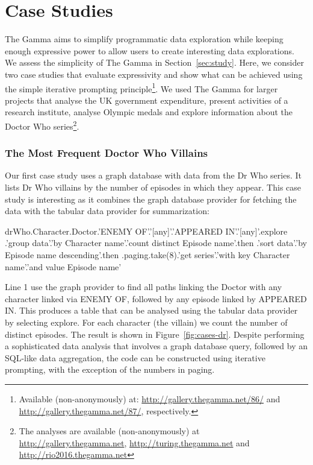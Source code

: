 \documentclass[manuscript,review,anonymous]{acmart}
\newcommand{\ikvd}[1]{{\fontfamily{zi4}\selectfont\small #1}}
\begin{document}

\section{Case Studies}
\label{sec:cases}

The Gamma aims to simplify programmatic data exploration while keeping enough expressive power
to allow users to create interesting data explorations. We assess the simplicity of The Gamma
in Section~\ref{sec:study}. Here, we consider two case studies that evaluate expressivity and show what
can be achieved using the simple iterative prompting principle\footnote{Available (non-anonymously) at:
\url{http://gallery.thegamma.net/86/} and  \url{http://gallery.thegamma.net/87/}, respectively.}.
We used The Gamma for larger projects that analyse the UK government expenditure, present
activities of a research institute, analyse Olympic medals and explore information about the Doctor
Who series\footnote{The analyses are available (non-anonymously)
at \url{http://gallery.thegamma.net}, \url{http://turing.thegamma.net} and \url{http://rio2016.thegamma.net}}.

\subsubsection*{The Most Frequent Doctor Who Villains}
Our first case study uses a graph database with data from the Dr Who series. It lists Dr Who villains
by the number of episodes in which they appear. This case study is interesting as it
combines the graph database provider for fetching the data with the tabular data provider for
summarization:

\begin{thegamma}
drWho.Character.Doctor.'ENEMY OF'.'[any]'.'APPEARED IN'.'[any]'.explore
  .'group data'.'by Character name'.'count distinct Episode name'.then
  .'sort data'.'by Episode name descending'.then
  .paging.take(8).'get series'.'with key Character name'.'and value Episode name'
\end{thegamma}

\noindent
Line 1 use the graph provider to find all paths linking the Doctor with any
character linked via \ikvd{ENEMY OF}, followed by any episode linked by \ikvd{APPEARED IN}.
This produces a table that can be analysed using the tabular data provider by selecting
\ikvd{explore}. For each character (the villain) we count the number of
distinct episodes. The result is shown in Figure~\ref{fig:cases-dr}.
Despite performing a sophisticated data analysis that involves a graph database query,
followed by an SQL-like data aggregation, the code can be constructed using iterative
prompting, with the exception of the numbers in paging.
\end{document}

